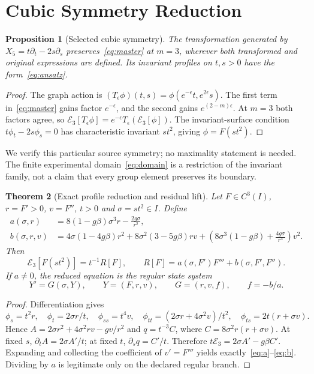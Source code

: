 \documentclass[11pt,a4paper]{article}
\newtheorem{theorem}{Theorem}[section]
\newtheorem{proposition}[theorem]{Proposition}
\theoremstyle{definition}
\theoremstyle{remark}
\newcommand{\E}{\mathcal E}
\begin{document}
\section{Cubic Symmetry Reduction}\label{sec:reduction}
\begin{proposition}[Selected cubic symmetry]\label{prop:symmetry}
The transformation generated by $X_5=t\partial_t-2s\partial_s$ preserves~\eqref{eq:master} at $m=3$, wherever both transformed and original expressions are defined. Its invariant profiles on $t,s>0$ have the form~\eqref{eq:ansatz}.
\end{proposition}
\begin{proof}
The graph action is $(T_\epsilon\phi)(t,s)=\phi(e^{-\epsilon}t,e^{2\epsilon}s)$. The first term in~\eqref{eq:master} gains factor $e^{-\epsilon}$, and the second gains $e^{(2-m)\epsilon}$. At $m=3$ both factors agree, so
$\E_3[T_\epsilon\phi]=e^{-\epsilon}T_\epsilon(\E_3[\phi])$.
The invariant-surface condition $t\phi_t-2s\phi_s=0$ has characteristic invariant $st^2$, giving $\phi=F(st^2)$.
\end{proof}
We verify this particular source symmetry; no maximality statement is needed. The finite experimental domain~\eqref{eq:domain} is a restriction of the invariant family, not a claim that every group element preserves its boundary.

\begin{theorem}[Exact profile reduction and residual lift]\label{thm:reduction}
Let $F\in C^3(I)$, $r=F'>0$, $v=F''$, $t>0$ and $\sigma=st^2\in I$. Define
\begin{align}
a(\sigma,r)&=8(1-g\beta)\sigma^3r-\frac{2g\sigma}{r^2},\label{eq:a}\\
b(\sigma,r,v)&=4\sigma(1-4g\beta)r^2
+8\sigma^2(3-5g\beta)rv
+\left(8\sigma^3(1-g\beta)+\frac{4g\sigma}{r^3}\right)v^2.
\label{eq:b}
\end{align}
Then
\begin{equation}
\E_3[F(st^2)]=t^{-1}R[F],\qquad R[F]=a(\sigma,F')F'''+b(\sigma,F',F'').
\label{eq:lift}
\end{equation}
If $a\ne0$, the reduced equation is the regular state system
\begin{equation}
Y'=G(\sigma,Y),\qquad Y=(F,r,v),\qquad
G=(r,v,f),\qquad f=-b/a.
\label{eq:state}
\end{equation}
\end{theorem}
\begin{proof}
Differentiation gives
\[
\phi_s=t^2r,\quad \phi_t=2\sigma r/t,\quad
\phi_{ss}=t^4v,\quad \phi_{tt}=(2\sigma r+4\sigma^2v)/t^2,\quad
\phi_{ts}=2t(r+\sigma v).
\]
Hence $A=2\sigma r^2+4\sigma^2rv-gv/r^2$ and
$q=t^{-3}C$, where $C=8\sigma^2r(r+\sigma v)$.
At fixed $s$, $\partial_tA=2\sigma A'/t$; at fixed $t$,
$\partial_sq=C'/t$. Therefore
$t\E_3=2\sigma A'-g\beta C'$. Expanding and collecting the coefficient of
$v'=F'''$ yields exactly~\eqref{eq:a}--\eqref{eq:b}. Dividing by $a$ is legitimate only on the declared regular branch.
\end{proof}
\end{document}
